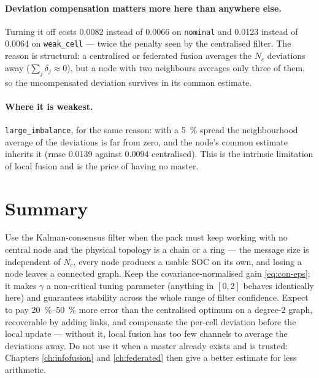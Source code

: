 \paragraph{Deviation compensation matters more here than anywhere else.} Turning it off costs
\num{0.0082} instead of \num{0.0066} on \texttt{nominal} and \num{0.0123} instead of \num{0.0064}
on \texttt{weak\_cell} --- twice the penalty seen by the centralised filter. The reason is
structural: a centralised or federated fusion averages the $N_c$ deviations away
($\sum_j\delta_j\approx0$), but a node with two neighbours averages only three of them, so the
uncompensated deviation survives in its common estimate.

\paragraph{Where it is weakest.} \texttt{large\_imbalance}, for the same reason: with a
\SI{5}{\percent} spread the neighbourhood average of the deviations is far from zero, and the
node's common estimate inherits it (rmse \num{0.0139} against \num{0.0094} centralised). This is
the intrinsic limitation of local fusion and is the price of having no master.

\section{Summary}
Use the Kalman-consensus filter when the pack must keep working with no central node and the
physical topology is a chain or a ring --- the message size is independent of $N_c$, every node
produces a usable SOC on its own, and losing a node leaves a connected graph. Keep the
covariance-normalised gain \eqref{eq:con-eps}; it makes $\gamma$ a non-critical tuning parameter
(anything in $[0,2]$ behaves identically here) and guarantees stability across the whole range of
filter confidence. Expect to pay \SIrange{20}{50}{\percent} more error than the centralised
optimum on a degree-2 graph, recoverable by adding links, and compensate the per-cell deviation
before the local update --- without it, local fusion has too few channels to average the
deviations away. Do not use it when a master already exists and is trusted: Chapters
\ref{ch:infofusion} and \ref{ch:federated} then give a better estimate for less arithmetic.
